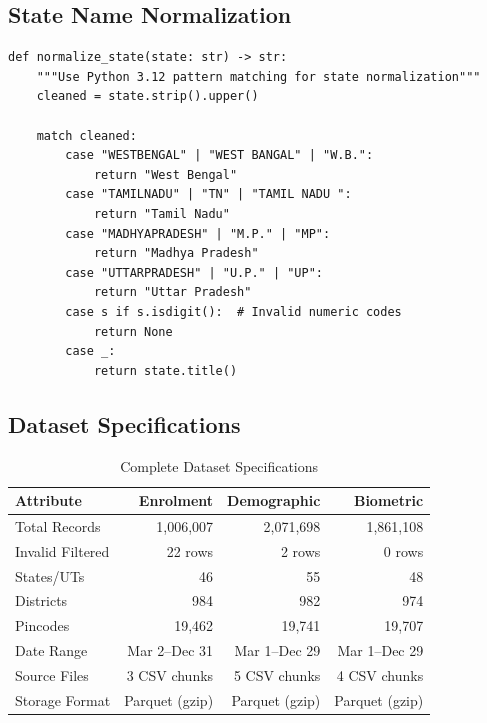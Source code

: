 \documentclass[12pt,a4paper]{article}
\begin{document}
\subsection{State Name Normalization}

\begin{lstlisting}[caption={Pattern Matching for State Normalization (Python 3.12+)}]
def normalize_state(state: str) -> str:
    """Use Python 3.12 pattern matching for state normalization"""
    cleaned = state.strip().upper()
    
    match cleaned:
        case "WESTBENGAL" | "WEST BANGAL" | "W.B.":
            return "West Bengal"
        case "TAMILNADU" | "TN" | "TAMIL NADU ":
            return "Tamil Nadu"
        case "MADHYAPRADESH" | "M.P." | "MP":
            return "Madhya Pradesh"
        case "UTTARPRADESH" | "U.P." | "UP":
            return "Uttar Pradesh"
        case s if s.isdigit():  # Invalid numeric codes
            return None
        case _:
            return state.title()
\end{lstlisting}

\subsection{Dataset Specifications}

\begin{table}[H]
\centering
\caption{Complete Dataset Specifications}
\begin{tabular}{lrrr}
\toprule
\textbf{Attribute} & \textbf{Enrolment} & \textbf{Demographic} & \textbf{Biometric} \\
\midrule
Total Records & 1,006,007 & 2,071,698 & 1,861,108 \\
Invalid Filtered & 22 rows & 2 rows & 0 rows \\
States/UTs & 46 & 55 & 48 \\
Districts & 984 & 982 & 974 \\
Pincodes & 19,462 & 19,741 & 19,707 \\
Date Range & Mar 2--Dec 31 & Mar 1--Dec 29 & Mar 1--Dec 29 \\
Source Files & 3 CSV chunks & 5 CSV chunks & 4 CSV chunks \\
Storage Format & Parquet (gzip) & Parquet (gzip) & Parquet (gzip) \\
\bottomrule
\end{tabular}
\end{table}

\newpage
\end{document}
